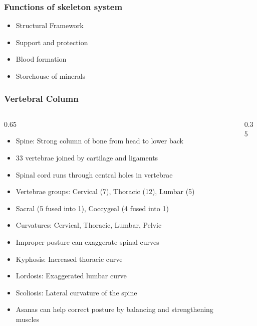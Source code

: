 \begin{frame}[fragile]\frametitle{Functions of skeleton system}

\begin{itemize}
\item Structural Framework
\item Support and protection
\item Blood formation
\item Storehouse of minerals
\end{itemize}
	  
\end{frame}


\begin{frame}[fragile]\frametitle{Vertebral Column}
\begin{columns}
    \begin{column}[T]{0.65\linewidth}
      \begin{itemize}
		\item Spine: Strong column of bone from head to lower back
		\item 33 vertebrae joined by cartilage and ligaments
		\item Spinal cord runs through central holes in vertebrae
		\item Vertebrae groups: Cervical (7), Thoracic (12), Lumbar (5)
		\item Sacral (5 fused into 1), Coccygeal (4 fused into 1)
		\item Curvatures: Cervical, Thoracic, Lumbar, Pelvic
		\item Improper posture can exaggerate spinal curves
		\item Kyphosis: Increased thoracic curve
		\item Lordosis: Exaggerated lumbar curve
		\item Scoliosis: Lateral curvature of the spine
		\item Asanas can help correct posture by balancing and strengthening muscles
	  \end{itemize}
    \end{column}
    \begin{column}[T]{0.35\linewidth}
		\begin{center}

\end{center}
\end{column}
\end{columns}
\end{frame}
